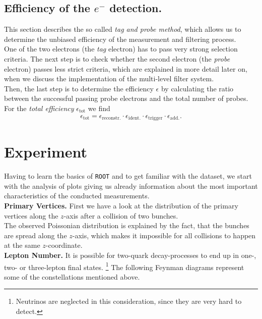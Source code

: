 \documentclass[twocolumn,
			   showpacs,%
               nofootinbib,
               aps,%
               prd,
               notitlepage,
               showkeys,
               10pt]{revtex4-1}
\begin{document}
\subsection{Efficiency of the $e^-$ detection.}
This section describes the so called \textit{tag and probe method}, which allows us to determine the unbiased efficiency of the measurement and filtering process.\\
One of the two electrons (the \textit{tag} electron) has to pass very strong selection criteria. The next step is to check whether the second electron (the \textit{probe} electron) passes less strict criteria, which are explained in more detail later on, when we discuss the implementation of the multi-level filter system. \\
Then, the last step is to determine the efficiency $\epsilon$ by calculating the ratio between the successful passing probe electrons and the total number of probes.\\
For the \textit{total efficiency} $\epsilon_{\text{tot}}$ we find 
\begin{align}
	\epsilon_{\text{tot}} = \epsilon_{\text{reconstr.}} \cdot \epsilon_{\text{ident.}} \cdot \epsilon_{\text{trigger}} \cdot \epsilon_{\text{add.}}.
\end{align}

\section{Experiment}

Having to learn the basics of \verb|ROOT| and to get familiar with the dataset, we start with the analysis of plots giving us already information about the most important characteristics of the conducted measurements.\\

\textbf{Primary Vertices.} First we have a look at the distribution of the primary vertices along the $z$-axis after a collision of two bunches.\\
The observed Poissonian distribution is explained by the fact, that the bunches are spread along the $z$-axis, which makes it impossible for all collisions to happen at the same $z$-coordinate.\\

\textbf{Lepton Number.} It is possible for two-quark decay-processes to end up in one-, two- or three-lepton final states. \footnote{Neutrinos are neglected in this consideration, since they are very hard to detect.} The following Feynman diagrams represent some of the constellations mentioned above. 
\end{document}
